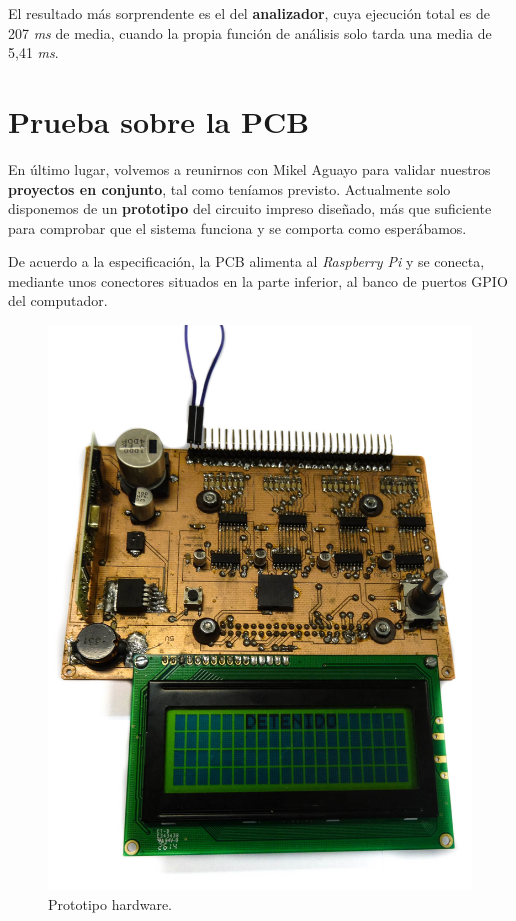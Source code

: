 El resultado más sorprendente es el del \textbf{analizador}, cuya ejecución total es de 207 \textit{ms} de media, cuando la propia función de análisis solo tarda una media de 5,41 \textit{ms}.

\section{Prueba sobre la PCB}

En último lugar, volvemos a reunirnos con Mikel Aguayo para validar nuestros \textbf{proyectos en conjunto}, tal como teníamos previsto. Actualmente solo disponemos de un \textbf{prototipo} del circuito impreso diseñado, más que suficiente para comprobar que el sistema funciona y se comporta como esperábamos.

De acuerdo a la especificación, la \acrshort{PCB} alimenta al \textit{Raspberry Pi} y se conecta, mediante unos conectores situados en la parte inferior, al banco de puertos \acrshort{GPIO} del computador.

\smallskip

\begin{figure}[H]
	\noindent \begin{centering}
		\includegraphics[width=\linewidth*2/3]{capitulo6/pcb}
		\par\end{centering}
	\smallskip
	\caption{\label{fig:pcb} Prototipo hardware.}
\end{figure} 

